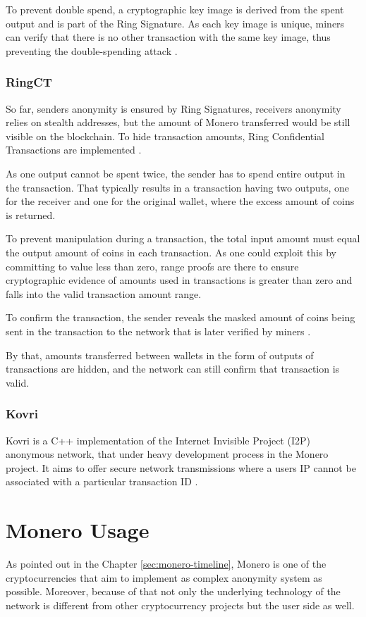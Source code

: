 \documentclass[
  printed, %
  table,   %
  lof,     %
  lot,     %
           oneside, color
]{fithesis3}
\begin{document}
To prevent double spend, a cryptographic key image is derived from the spent output and is part of the Ring Signature. As each key image is unique, miners can verify that there is no other transaction with the same key image, thus preventing the double-spending attack \cite{miller2017empirical}.

\subsection{RingCT}
\label{sec:ringct}
So far, senders anonymity is ensured by Ring Signatures, receivers anonymity relies on stealth addresses, but the amount of Monero transferred would be still visible on the blockchain. To hide transaction amounts, Ring Confidential Transactions are implemented \cite{noether2015ring}.

As one output cannot be spent twice, the sender has to spend entire output in the transaction. That typically results in a transaction having two outputs, one for the receiver and one for the original wallet, where the excess amount of coins is returned.	 

To prevent manipulation during a transaction, the total input amount must equal the output amount of coins in each transaction. As one could exploit this by committing to value less than zero, range proofs are there to ensure cryptographic evidence of amounts used in transactions is greater than zero and falls into the valid transaction amount range. 

To confirm the transaction, the sender reveals the masked amount of coins being sent in the transaction to the network that is later verified by miners \cite{sun2017ringct}. 

By that, amounts transferred between wallets in the form of outputs of transactions are hidden, and the network can still confirm that transaction is valid.

\subsection{Kovri}
Kovri is a C++ implementation of the Internet Invisible Project (I2P) anonymous network, that under heavy development process in the Monero project. It aims to offer secure network transmissions where a users IP cannot be associated with a particular transaction ID \cite{monerokovri}. 

\chapter{Monero Usage}
As pointed out in the Chapter \ref{sec:monero-timeline}, Monero is one of the cryptocurrencies that aim to implement as complex anonymity system as possible. Moreover, because of that not only the underlying technology of the network is different from other cryptocurrency projects but the user side as well. 
\end{document}
